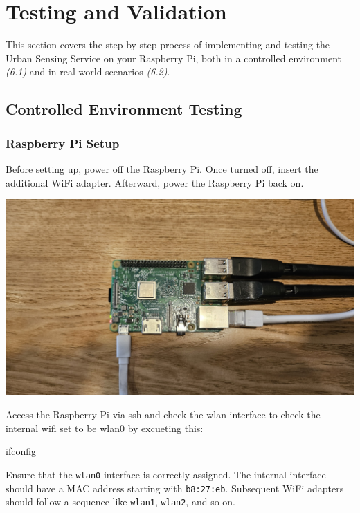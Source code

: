 \documentclass[
  letterpaper,
]{scrbook}
\newenvironment{Shaded}{\begin{snugshade}}{\end{snugshade}}
\newcommand{\ExtensionTok}[1]{\textcolor[rgb]{0.00,0.23,0.31}{#1}}
\begin{document}
\chapter{Testing and Validation}\label{testing-and-validation}

This section covers the step-by-step process of implementing and testing
the Urban Sensing Service on your Raspberry Pi, both in a controlled
environment \emph{(6.1)} and in real-world scenarios \emph{(6.2)}.

\section{Controlled Environment
Testing}\label{controlled-environment-testing}

\subsection{Raspberry Pi Setup}\label{raspberry-pi-setup-1}

Before setting up, power off the Raspberry Pi. Once turned off, insert
the additional WiFi adapter. Afterward, power the Raspberry Pi back on.

\includegraphics{content/material/ch2/pi_plugged.jpg}

Access the Raspberry Pi via ssh and check the wlan interface to check
the internal wifi set to be wlan0 by excueting this:

\begin{Shaded}
\begin{Highlighting}[]
\ExtensionTok{ifconfig}
\end{Highlighting}
\end{Shaded}

Ensure that the \texttt{wlan0} interface is correctly assigned. The
internal interface should have a MAC address starting with
\texttt{b8:27:eb}. Subsequent WiFi adapters should follow a sequence
like \texttt{wlan1}, \texttt{wlan2}, and so on.
\end{document}
